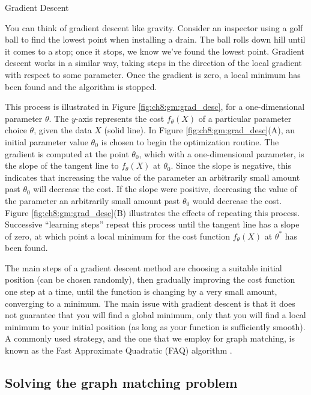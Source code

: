 \begin{floatingbox}[h]\caption{Gradient Descent}

You can think of gradient descent like gravity. Consider an inspector using a golf ball to find the lowest point when installing a drain. The ball rolls down hill until it comes to a stop; once it stops, we know we've found the lowest point. Gradient descent works in a similar way, taking steps in the direction of the local gradient with respect to some parameter. Once the gradient is zero, a local minimum has been found and the algorithm is stopped. 

This process is illustrated in Figure \ref{fig:ch8:gm:grad_desc}, for a one-dimensional parameter $\theta$. The $y$-axis represents the cost $f_\theta(X)$ of a particular parameter choice $\theta$, given the data $X$ (solid line). In Figure \ref{fig:ch8:gm:grad_desc}(A), an initial parameter value $\theta_0$ is chosen to begin the optimization routine. The gradient is computed at the point $\theta_0$, which with a one-dimensional parameter, is the slope of the tangent line to $f_\theta(X)$ at $\theta_0$. Since the slope is negative, this indicates that increasing the value of the parameter an arbitrarily small amount past $\theta_0$ will decrease the cost. If the slope were positive, decreasing the value of the parameter an arbitrarily small amount past $\theta_0$ would decrease the cost. Figure \ref{fig:ch8:gm:grad_desc}(B) illustrates the effects of repeating this process. Successive ``learning steps'' repeat this process until the tangent line has a slope of zero, at which point a local minimum for the cost function $f_\theta(X)$ at $\theta^*$ has been found. 

The main steps of a gradient descent method are choosing a suitable initial position (can be chosen randomly), then gradually improving the cost function one step at a time, until the function is changing by a very small amount, converging to a minimum. The main issue with gradient descent is that it does not guarantee that you will find a global minimum, only that you will find a local minimum to your initial position (as long as your function is sufficiently smooth).  A commonly used strategy, and the one that we employ for graph matching, is known as the Fast Approximate Quadratic (FAQ) algorithm \cite{Vogelstein2015Apr}.

\end{floatingbox}

\subsection{Solving the graph matching problem}

